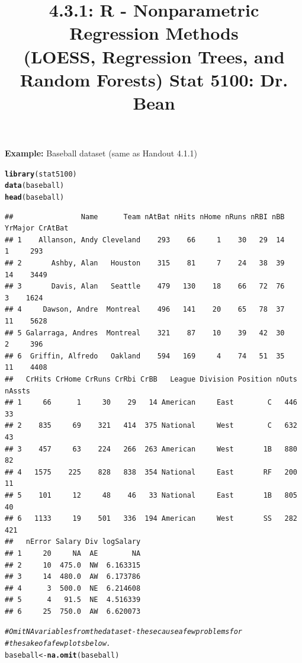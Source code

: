 \documentclass{article}\usepackage[]{graphicx}\usepackage[]{color}
\makeatletter
\newcommand{\hlcom}[1]{\textcolor[rgb]{0.678,0.584,0.686}{\textit{#1}}}%
\newcommand{\hlstd}[1]{\textcolor[rgb]{0.345,0.345,0.345}{#1}}%
\newcommand{\hlkwb}[1]{\textcolor[rgb]{0.69,0.353,0.396}{#1}}%
\newcommand{\hlkwd}[1]{\textcolor[rgb]{0.737,0.353,0.396}{\textbf{#1}}}%
\newenvironment{kframe}{%
 \def\at@end@of@kframe{}%
 \ifinner\ifhmode%
  \def\at@end@of@kframe{\end{minipage}}%
  \begin{minipage}{\columnwidth}%
 \fi\fi%
 \def\FrameCommand##1{\hskip\@totalleftmargin \hskip-\fboxsep
 \colorbox{shadecolor}{##1}\hskip-\fboxsep
     \hskip-\linewidth \hskip-\@totalleftmargin \hskip\columnwidth}%
 \MakeFramed {\advance\hsize-\width
   \@totalleftmargin\z@ \linewidth\hsize
   \@setminipage}}%
 {\par\unskip\endMakeFramed%
 \at@end@of@kframe}
\newenvironment{knitrout}{}{} %
\makeatother
\begin{document}
\title{%
  4.3.1: R - Nonparametric Regression Methods \\
  (LOESS, Regression Trees, and Random Forests)
  \smallskip
  \large Stat 5100: Dr. Bean
}
\date{}

\maketitle

\textbf{Example: } Baseball dataset (same as Handout 4.1.1)

\begin{knitrout}
\color{fgcolor}\begin{kframe}
\begin{alltt}
\hlkwd{library}\hlstd{(stat5100)}
\hlkwd{data}\hlstd{(baseball)}
\hlkwd{head}\hlstd{(baseball)}
\end{alltt}
\begin{verbatim}
##                Name      Team nAtBat nHits nHome nRuns nRBI nBB YrMajor CrAtBat
## 1    Allanson, Andy Cleveland    293    66     1    30   29  14       1     293
## 2       Ashby, Alan   Houston    315    81     7    24   38  39      14    3449
## 3       Davis, Alan   Seattle    479   130    18    66   72  76       3    1624
## 4     Dawson, Andre  Montreal    496   141    20    65   78  37      11    5628
## 5 Galarraga, Andres  Montreal    321    87    10    39   42  30       2     396
## 6  Griffin, Alfredo   Oakland    594   169     4    74   51  35      11    4408
##   CrHits CrHome CrRuns CrRbi CrBB   League Division Position nOuts nAssts
## 1     66      1     30    29   14 American     East        C   446     33
## 2    835     69    321   414  375 National     West        C   632     43
## 3    457     63    224   266  263 American     West       1B   880     82
## 4   1575    225    828   838  354 National     East       RF   200     11
## 5    101     12     48    46   33 National     East       1B   805     40
## 6   1133     19    501   336  194 American     West       SS   282    421
##   nError Salary Div logSalary
## 1     20     NA  AE        NA
## 2     10  475.0  NW  6.163315
## 3     14  480.0  AW  6.173786
## 4      3  500.0  NE  6.214608
## 5      4   91.5  NE  4.516339
## 6     25  750.0  AW  6.620073
\end{verbatim}
\begin{alltt}
\hlcom{# Omit NA variables from the dataset- these cause a few problems for}
\hlcom{# the sake of a few plots below.}
\hlstd{baseball} \hlkwb{<-} \hlkwd{na.omit}\hlstd{(baseball)}
\end{alltt}
\end{kframe}
\end{knitrout}
\end{document}
